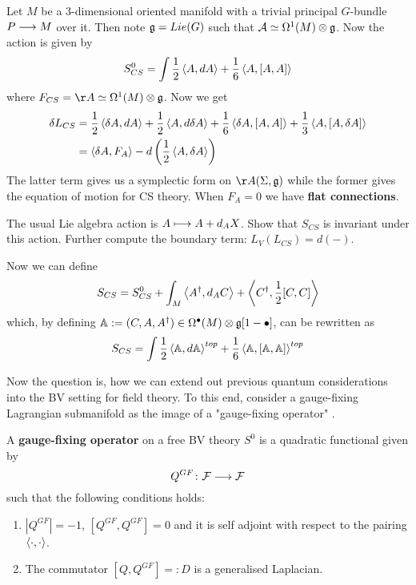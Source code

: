 \begin{example}
  Let $M$ be a $3$-dimensional oriented manifold with a trivial principal $G$-bundle $P \longrightarrow M$ over it. Then note $\mathfrak{g} = Lie(G)$ such that $\mathcal{A} \simeq \Omega^1(M) \otimes \mathfrak{g}$. Now the action is given by
  \begin{equation}
    S_{CS}^0 = \int \frac{1}{2} \left\langle A , dA \right\rangle + \frac{1}{6} \left\langle A , [A,A] \right\rangle
  \end{equation}
  where $F_{CS} = \AA \simeq \Omega^1(M) \otimes \gf$. Now we get
  \begin{align}
    \delta L_{CS} &= \frac{1}{2} \left\langle \delta A , dA \right\rangle + \frac{1}{2} \left\langle A , d \delta A \right\rangle + \frac{1}{6} \left\langle \delta A , [A,A] \right\rangle + \frac{1}{3} \left\langle A , [A,\delta A] \right\rangle \\
    &= \left\langle \delta A , F_A \right\rangle - d \left( \frac{1}{2} \left\langle A , \delta A \right\rangle \right)
  \end{align}
  The latter term gives us a symplectic form on $\AA(\Sigma, \gf)$ while the former gives the equation of motion for CS theory. When $F_A = 0$ we have \textbf{flat connections}.

  \begin{ex}
    The usual Lie algebra action is $A \longmapsto A + d_A X$. Show that $S_{CS}$ is invariant under this action. Further compute the boundary term: $L_V (L_{CS}) = d(-)$.
  \end{ex}

  Now we can define
  \begin{equation}
    S_{CS} = S_{CS}^0 + \int_M \left\langle A^\dagger , d_A C \right\rangle + \left\langle C^\dagger , \frac{1}{2}[C,C] \right\rangle
  \end{equation}
  which, by defining $\mathbb{A} := (C,A,A^\dagger) \in \Omega^\bullet (M) \otimes \mathfrak{g}[1- \bullet]$, can be rewritten as
  \begin{equation}
    S_{CS} = \int \frac{1}{2} \left\langle \mathbb{A} , d\mathbb{A} \right\rangle^{top} + \frac{1}{6} \left\langle \mathbb{A} , [\mathbb{A}, \mathbb{A}] \right\rangle^{top}
  \end{equation}
\end{example}

Now the question is, how we can extend out previous quantum considerations into the BV setting for field theory. To this end, consider a gauge-fixing Lagrangian submanifold as the image of a "gauge-fixing operator" \cite{Costello}.

\begin{definition}
  A \textbf{gauge-fixing operator} on a free BV theory $S^0$ is a quadratic functional given by
  \begin{equation}
    Q^{GF} \colon {\mathcal{F}} \longrightarrow {\mathcal{F}}
  \end{equation}
  such that the following conditions holds:
  \begin{enumerate}
    \item $|Q^{GF}| = -1$, $[Q^{GF}, Q^{GF}] = 0$ and it is self adjoint with respect to the pairing $\left\langle \cdot , \cdot \right\rangle$.
    \item The commutator $[Q, Q^{GF}] =: D$ is a generalised Laplacian.
  \end{enumerate}
\end{definition}

